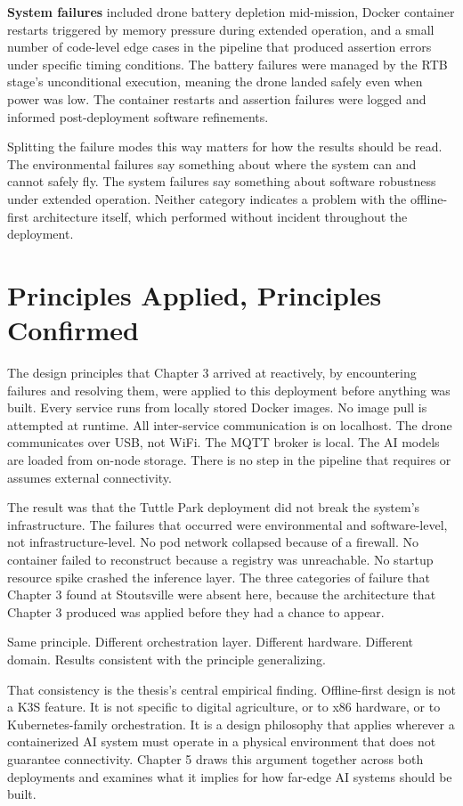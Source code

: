 \textbf{System failures} included drone battery depletion mid-mission, Docker container restarts triggered by memory pressure during extended operation, and a small number of code-level edge cases in the pipeline that produced assertion errors under specific timing conditions. The battery failures were managed by the RTB stage's unconditional execution, meaning the drone landed safely even when power was low. The container restarts and assertion failures were logged and informed post-deployment software refinements.

Splitting the failure modes this way matters for how the results should be read. The environmental failures say something about where the system can and cannot safely fly. The system failures say something about software robustness under extended operation. Neither category indicates a problem with the offline-first architecture itself, which performed without incident throughout the deployment.

\section{Principles Applied, Principles Confirmed}
\label{sec:ch4_results}
The design principles that Chapter 3 arrived at reactively, by encountering failures and resolving them, were applied to this deployment before anything was built. Every service runs from locally stored Docker images. No image pull is attempted at runtime. All inter-service communication is on localhost. The drone communicates over USB, not WiFi. The MQTT broker is local. The AI models are loaded from on-node storage. There is no step in the pipeline that requires or assumes external connectivity.

The result was that the Tuttle Park deployment did not break the system's infrastructure. The failures that occurred were environmental and software-level, not infrastructure-level. No pod network collapsed because of a firewall. No container failed to reconstruct because a registry was unreachable. No startup resource spike crashed the inference layer. The three categories of failure that Chapter 3 found at Stoutsville were absent here, because the architecture that Chapter 3 produced was applied before they had a chance to appear.

Same principle. Different orchestration layer. Different hardware. Different domain. Results consistent with the principle generalizing.

That consistency is the thesis's central empirical finding. Offline-first design is not a K3S feature. It is not specific to digital agriculture, or to x86 hardware, or to Kubernetes-family orchestration. It is a design philosophy that applies wherever a containerized AI system must operate in a physical environment that does not guarantee connectivity. Chapter 5 draws this argument together across both deployments and examines what it implies for how far-edge AI systems should be built.